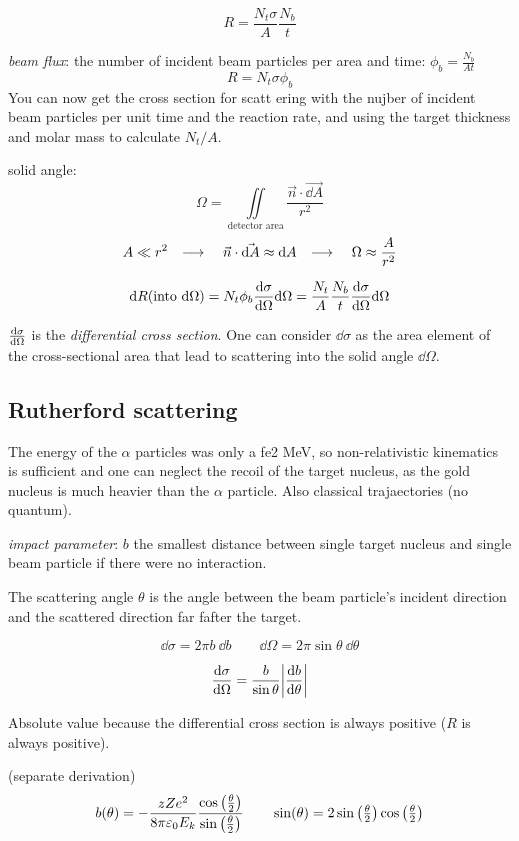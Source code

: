 \documentclass[10pt, a4paper, twocolumn]{article}
\newcommand{\deff}[1]{\par \noindent \textit{#1}: }
\newcommand{\arr}{\ensuremath{\longrightarrow\ }}
\newcommand{\eps}{\ensuremath{\varepsilon _0}}
\begin{document}
\[R=\frac{N_t\sigma}{A}\frac{N_b}{t}\]

\deff{beam flux} the number of incident beam particles per area and time: $\phi _b=\frac{N_b}{At}$
\[R=N_t\sigma \phi _b\]
You can now get the cross section for scatt ering with the nujber of incident beam particles per unit time and the reaction rate, and using the target thickness and molar mass to calculate $N_t/A$.

solid angle:
\[\Omega =\iint\limits_\text{detector area}
\frac{\vec n \cdot \vec{\dd A}}{r^2}\]
\[A\ll r^2 \qq{\arr} \vec n \cdot \vec{\dd A} \approx \dd A
\qq{\arr} \Omega \approx \frac{A}{r^2}\]

\[\dd R(\text{into }\dd \Omega)
= N_t \phi _b\dv{\sigma}{\Omega}\dd \Omega
=\frac{N_t}{A}\frac{N_b}{t}\dv{\sigma}{\Omega}\dd \Omega\]

$\dv{\sigma}{\Omega}$ is the \emph{differential cross section}. One can consider $\dd \sigma$ as the area element of the cross-sectional area that lead to scattering into the solid angle $\dd \Omega$.

\subsection{Rutherford scattering}

The energy of the $\alpha$ particles was only a fe2 MeV, so non-relativistic kinematics is sufficient and one can neglect the recoil of the target nucleus, as the gold nucleus is much heavier than the $\alpha$ particle. Also classical trajaectories (no quantum).

\deff{impact parameter} $b$ the smallest distance between single target nucleus and single beam particle if there were no interaction.

The scattering angle $\theta$ is the angle between the beam particle's incident direction and the scattered direction far fafter the target.

\[\dd \sigma =2\pi b\ \dd b
\qquad \dd \Omega =2\pi \sin \theta \ \dd \theta\]

\[\dv{\sigma}{\Omega} = \frac{b}{\sin \theta}
\abs{\frac{\dd b}{\dd \theta}}\]

Absolute value because the differential cross section is always positive ($R$ is always positive).

(separate derivation)
\[b(\theta) =-\frac{zZe^2}{8\pi \eps E_k}
\frac{\cos \qty(\frac{\theta}{2})}
{\sin \qty(\frac{\theta}{2})}
\qquad \sin (\theta)
= 2\sin\qty(\tfrac{\theta}2) \cos\qty(\tfrac{\theta}2) \]
\end{document}
